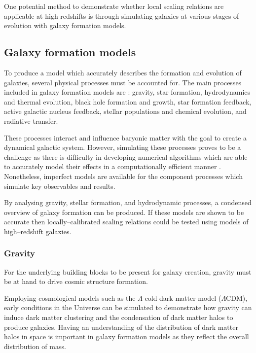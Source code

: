 \documentclass[12pt, twocolumn, nofootinbib]{revtex4-1}    %
\begin{document}
One potential method to demonstrate whether local scaling relations are applicable at high redshifts is through simulating galaxies at various stages of evolution with galaxy formation models. 

\vspace{2ex} %
\subsection{Galaxy formation models}
\noindent
To produce a model which accurately describes the formation and evolution of galaxies, several physical processes must be accounted for. The main processes included in galaxy formation models are \citep{2015ARA&A..53...51S}: gravity, star formation, hydrodynamics and thermal evolution, black hole formation and growth, star formation feedback, active galactic nucleus feedback, stellar populations and chemical evolution, and radiative transfer. 

These processes interact and influence baryonic matter with the goal to create a dynamical galactic system. However, simulating these processes proves to be a challenge as there is difﬁculty in developing numerical algorithms which are able to accurately model their effects in a computationally efficient manner \citep{2015MNRAS.450.1937C}. Nonetheless, imperfect models are available for the component processes which simulate key observables and results. 

By analysing gravity, stellar formation, and hydrodynamic processes, a condensed overview of galaxy formation can be produced. If these models are shown to be accurate then locally--calibrated scaling relations could be tested using models of high--redshift galaxies.

\vspace{2ex} %
\subsubsection{Gravity}
\noindent
For the underlying building blocks to be present for galaxy creation, gravity must be at hand to drive cosmic structure formation. 

Employing cosmological models such as the $\Lambda$ cold dark matter model ($\Lambda$CDM), early conditions in the Universe can be simulated to demonstrate how gravity can induce dark matter clustering \citep{1978MNRAS.183..341W} and the condensation of dark matter halos \citep{1996ApJ...462..563N} to produce galaxies. Having an understanding of the distribution of dark matter halos in space is important in galaxy formation models as they reflect the overall distribution of mass.
\end{document}
